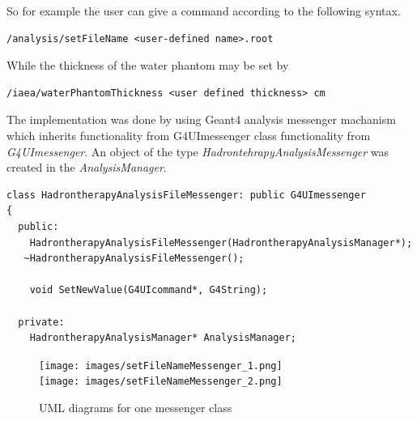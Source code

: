 So for example the user can give a command according to the following syntax.
\scriptsize
\begin{verbatim}
/analysis/setFileName <user-defined name>.root
\end{verbatim}
\normalsize
While the thickness of the water phantom may be set by
\scriptsize
\begin{verbatim}
/iaea/waterPhantomThickness <user defined thickness> cm
\end{verbatim}
\normalsize


The implementation was done by using Geant4 analysis messenger machanism which inherits functionality from G4UImessenger class functionality from \textit{G4UImessenger}. An object of the type \textit{HadrontehrapyAnalysisMessenger} was created in the \textit{AnalysisManager}.


\scriptsize
\begin{verbatim}
class HadrontherapyAnalysisFileMessenger: public G4UImessenger
{
  public:
    HadrontherapyAnalysisFileMessenger(HadrontherapyAnalysisManager*);
   ~HadrontherapyAnalysisFileMessenger();
    
    void SetNewValue(G4UIcommand*, G4String);
    
  private:
    HadrontherapyAnalysisManager* AnalysisManager;
\end{verbatim}
\normalsize
\begin{figure}[!h] 
\begin{center}
\texttt{[image: images/setFileNameMessenger\_1.png]}  
\\
\texttt{[image: images/setFileNameMessenger\_2.png]}  
\caption{\label{fig:messengerUML} UML diagrams for one messenger class}
 
 \end{center}
 \end{figure}

\clearpage
\renewcommand{\theequation}{D\arabic{equation}}
\setcounter{equation}{0}  
\renewcommand{\thefigure}{D\arabic{figure}}
\setcounter{figure}{0}
\renewcommand{\thetable}{D\arabic{table}}
\setcounter{table}{0}
\renewcommand{\thesection}{D}
\setcounter{section}{1}
\setcounter{subsection}{0}
